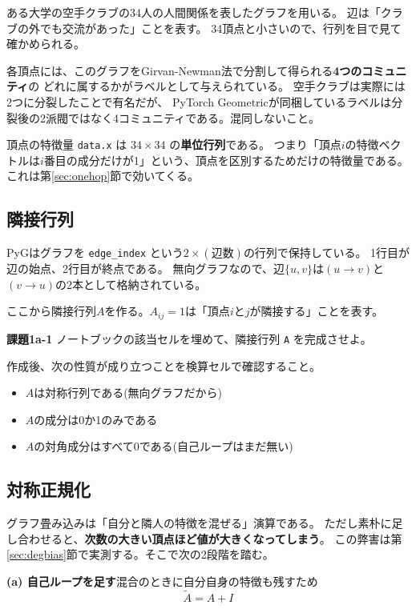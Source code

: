 \documentclass[11pt,a4paper]{jsarticle}
\begin{document}
ある大学の空手クラブの34人の人間関係を表したグラフを用いる。
辺は「クラブの外でも交流があった」ことを表す。
34頂点と小さいので、行列を目で見て確かめられる。

各頂点には、このグラフをGirvan-Newman法で分割して得られる\textbf{4つのコミュニティ}の
どれに属するかがラベルとして与えられている。
空手クラブは実際には2つに分裂したことで有名だが、
PyTorch Geometricが同梱しているラベルは分裂後の2派閥ではなく4コミュニティである。混同しないこと。

頂点の特徴量 \verb|data.x| は $34\times34$ の\textbf{単位行列}である。
つまり「頂点$i$の特徴ベクトルは$i$番目の成分だけが1」という、頂点を区別するためだけの特徴量である。
これは第\ref{sec:onehop}節で効いてくる。

\subsection{隣接行列}

PyGはグラフを \verb|edge_index| という$2\times(\mbox{辺数})$の行列で保持している。
1行目が辺の始点、2行目が終点である。
無向グラフなので、辺$\{u,v\}$は$(u\to v)$と$(v\to u)$の2本として格納されている。

ここから隣接行列$A$を作る。$A_{ij}=1$は「頂点$i$と$j$が隣接する」ことを表す。

\begin{screen}
\textbf{課題1a-1} \quad ノートブックの該当セルを埋めて、隣接行列 \verb|A| を完成させよ。
\end{screen}

\noindent
作成後、次の性質が成り立つことを検算セルで確認すること。

\begin{itemize}
\item $A$は対称行列である(無向グラフだから)
\item $A$の成分は0か1のみである
\item $A$の対角成分はすべて0である(自己ループはまだ無い)
\end{itemize}

\subsection{対称正規化}

グラフ畳み込みは「自分と隣人の特徴を混ぜる」演算である。
ただし素朴に足し合わせると、\textbf{次数の大きい頂点ほど値が大きくなってしまう}。
この弊害は第\ref{sec:degbias}節で実測する。そこで次の2段階を踏む。

\medskip
\noindent
\textbf{(a) 自己ループを足す}\quad 混合のときに自分自身の特徴も残すため
\begin{equation}
\tilde{A} = A + I
\end{equation}
\end{document}
